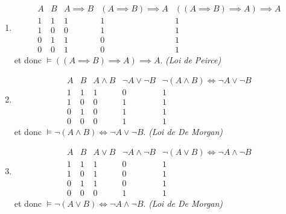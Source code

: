 \documentclass[12pt,french,a4paper]{article}
\begin{document}
\begin{question}
\begin{enumerate}
\item\begin{displaymath}
\begin{array}{cc|ccc}
A & B & A \implies B & (A \implies B) \implies A &  ((A \implies B) \implies A) \implies A\\
\hline
1 & 1 & 1 & 1 & 1\\
1 & 0 & 0 & 1 & 1\\
0 & 1 & 1 & 0 & 1\\
0 & 0 & 1 & 0 & 1
\end{array}
\end{displaymath}
et donc $\vDash  ((A \implies B) \implies A) \implies A.$ \hfill \emph{(Loi de Peirce)}


\item\begin{displaymath}
\begin{array}{cc|cccc}
A & B & A \wedge B &  \neg A \vee \neg B & \neg(A \wedge B) \iff  \neg A \vee \neg B\\
\hline
1 & 1 & 1 & 0 & 1\\
1 & 0 & 0 & 1 & 1\\
0 & 1 & 0 & 1 & 1\\
0 & 0 & 0 & 1 & 1
\end{array}
\end{displaymath}
et donc $\vDash  \neg(A \wedge B) \iff  \neg A \vee \neg B.$ \hfill \emph{(Loi de De Morgan)}


\item\begin{displaymath}
\begin{array}{cc|cccc}
A & B & A \vee B &  \neg A \wedge \neg B & \neg(A \vee B) \iff  \neg A \wedge \neg B\\
\hline
1 & 1 & 1 & 0 & 1\\
1 & 0 & 1 & 0 & 1\\
0 & 1 & 1 & 0 & 1\\
0 & 0 & 0 & 1 & 1
\end{array}
\end{displaymath}
et donc $\vDash  \neg(A \vee B) \iff  \neg A \wedge \neg B.$ \hfill \emph{(Loi de De Morgan)}

\end{enumerate}
\end{question}
\end{document}
